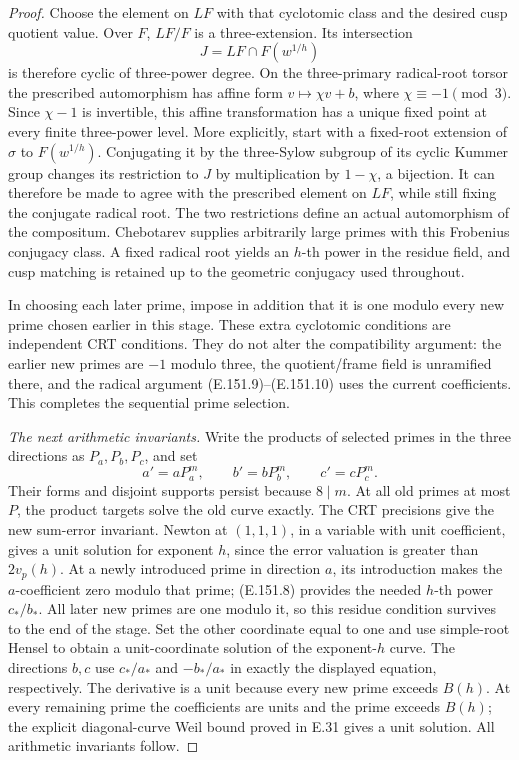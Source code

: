 \begin{proof}
Choose the element on \(LF\) with that cyclotomic class and the
desired cusp quotient value. Over \(F\), \(LF/F\) is a
three-extension. Its intersection
\[
 J=LF\cap F(w^{1/h})
 \tag{E.151.10}
\]
is therefore cyclic of three-power degree. On the three-primary
radical-root torsor the prescribed automorphism has affine form
\(v\mapsto\chi v+b\), where \(\chi\equiv-1\pmod3\).
Since \(\chi-1\) is invertible, this affine transformation has
a unique fixed point at every finite three-power level.
More explicitly, start with a fixed-root extension of \(\sigma\)
to \(F(w^{1/h})\). Conjugating it by the three-Sylow subgroup
of its cyclic Kummer group changes its restriction to \(J\)
by multiplication by \(1-\chi\), a bijection. It can therefore
be made to agree with the prescribed element on \(LF\), while
still fixing the conjugate radical root. The two restrictions
define an actual automorphism of the compositum. Chebotarev
\citep[Theorem~8.31, p.~147]{MilneANT2020} supplies arbitrarily
large primes with this Frobenius conjugacy class. A fixed radical
root yields an \(h\)-th power in the residue field, and cusp
matching is retained up to the geometric conjugacy used throughout.

In choosing each later prime, impose in addition that it is one
modulo every new prime chosen earlier in this stage. These extra
cyclotomic conditions are independent CRT conditions. They do not
alter the compatibility argument: the earlier new primes are
\(-1\) modulo three, the quotient/frame field is unramified there,
and the radical argument (E.151.9)--(E.151.10) uses the current
coefficients. This completes the sequential prime selection.

\emph{The next arithmetic invariants.}
Write the products of selected primes in the three directions as
\(P_a,P_b,P_c\), and set
\[
 a'=aP_a^m,
 \qquad b'=bP_b^m,
 \qquad c'=cP_c^m.
 \tag{E.151.11}
\]
Their forms and disjoint supports persist because \(8\mid m\).
At all old primes at most \(P\), the product targets solve the
old curve exactly. The CRT precisions give the new sum-error
invariant. Newton at \((1,1,1)\), in a variable with unit
coefficient, gives a unit solution for exponent \(h\), since
the error valuation is greater than \(2v_p(h)\).
At a newly introduced prime in direction \(a\), its introduction
makes the \(a\)-coefficient zero modulo that prime; (E.151.8)
provides the needed \(h\)-th power \(c_*/b_*\).
All later new primes are one modulo it, so this residue condition
survives to the end of the stage. Set the other coordinate equal
to one and use simple-root Hensel to obtain a unit-coordinate
solution of the exponent-\(h\) curve. The directions \(b,c\)
use \(c_*/a_*\) and \(-b_*/a_*\) in exactly the displayed
equation, respectively. The derivative is a unit because every
new prime exceeds \(B(h)\).
At every remaining prime the coefficients are units and the prime
exceeds \(B(h)\); the explicit diagonal-curve Weil bound proved
in E.31 gives a unit solution. All arithmetic invariants follow.


\end{proof}
